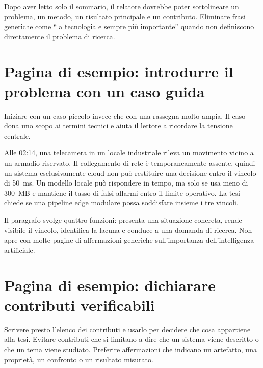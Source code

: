 \begin{keypoint}
Dopo aver letto solo il sommario, il relatore dovrebbe poter sottolineare un
problema, un metodo, un risultato principale e un contributo. Eliminare frasi
generiche come ``la tecnologia e sempre più importante'' quando non definiscono
direttamente il problema di ricerca.
\end{keypoint}

\section{Pagina di esempio: introdurre il problema con un caso guida}
Iniziare con un caso piccolo invece che con una rassegna molto ampia. Il caso
dona uno scopo ai termini tecnici e aiuta il lettore a ricordare la tensione
centrale.

\begin{resultbox}
Alle 02:14, una telecamera in un locale industriale rileva un movimento vicino a
un armadio riservato. Il collegamento di rete è temporaneamente assente, quindi
un sistema esclusivamente cloud non può restituire una decisione entro il
vincolo di 50~ms. Un modello locale può rispondere in tempo, ma solo se usa meno
di 300~MB e mantiene il tasso di falsi allarmi entro il limite operativo. La
tesi chiede se una pipeline edge modulare possa soddisfare insieme i tre
vincoli.
\end{resultbox}

Il paragrafo svolge quattro funzioni: presenta una situazione concreta, rende
visibile il vincolo, identifica la lacuna e conduce a una domanda di ricerca.
Non apre con molte pagine di affermazioni generiche sull'importanza
dell'intelligenza artificiale.

\section{Pagina di esempio: dichiarare contributi verificabili}
Scrivere presto l'elenco dei contributi e usarlo per decidere che cosa appartiene
alla tesi. Evitare contributi che si limitano a dire che un sistema viene
descritto o che un tema viene studiato. Preferire affermazioni che indicano un
artefatto, una proprietà, un confronto o un risultato misurato.

